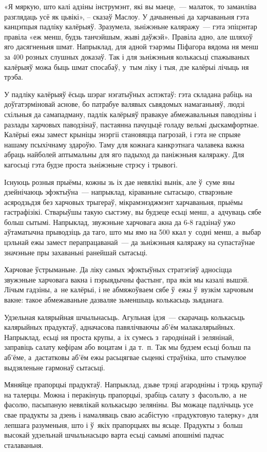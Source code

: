 «Я мяркую, што калі адзіны інструмэнт, які вы маеце,~--- малаток, то заманліва разглядаць усё як цьвікі», -- сказаў Маслоу. У дачыненьні да харчаваньня гэта канцэпцыя падліку калёрыяў. Зразумела, зьніжэньне каляражу~--- гэта эпіцэнтар правіла «еж менш, будзь танчэйшым, жыві даўжэй». Правіла адно, але шляхоў яго дасягненьня шмат. Напрыклад, для адной тэарэмы Піфагора вядома ня менш за 400 розных слушных доказаў. Так і для зьніжэньня колькасьці спажываных калёрыяў можа быць шмат спосабаў, у~тым ліку і тыя, дзе калёрыі лічыць ня трэба.

У падліку калёрыяў ёсьць шэраг нэгатыўных аспэктаў: гэта складана рабіць на доўгатэрміновай аснове, бо патрабуе валявых сьвядомых намаганьняў, людзі схільныя да самападману, падлік калёрыяў правакуе абмежавальныя паводзіны і разлады харчовых паводзінаў, пастаянна пачуцьцё голаду вельмі дыскамфортнае. Калёрыі ежы замест крыніцы энэргіі становяцца пагрозай, і гэта не спрыяе нашаму псыхічнаму здароўю. Таму для кожнага канкрэтнага чалавека важна абраць найболей аптымальны для яго падыход да паніжэньня каляражу. Для кагосьці гэта будзе проста зьніжэньне стрэсу і трывогі.

Існуюць розныя прыёмы, кожны зь іх дае невялікі вынік, але ў~суме яны дзейнічаюць эфэктыўна~--- напрыклад, кіраваньне сытасьцю, стварэньне асяродзьдзя без харчовых трыгераў, мікрамэнэджмэнт харчаваньня, прыёмы гастрафізікі. Стварыўшы такую сыстэму, вы будзеце есьці менш, а~адчуваць сябе больш сытымі. Напрыклад, звужэньне харчовага акна да 6-8 гадзінаў ужо аўтаматычна прыводзіць да таго, што мы ямо на 500 ккал у~содні менш, а~выбар цэльнай ежы замест перапрацаванай~--- да зьніжэньня каляражу на супастаўнае значэньне пры захаваньні ранейшай сытасьці.

Харчовае ўстрыманьне. Да ліку самых эфэктыўных стратэгіяў адносіцца звужэньне харчовага вакна і пэрыядычны фастынг, пра якія мы казалі вышэй. Лічым гадзіны, а~не калёрыі, і не абмяжоўваем сябе ў~ежы ў~вузкім харчовым вакне: такое абмежаваньне дазваляе зьменшыць колькасьць зьяданага.

Удзельная калярыйная шчыльнасьць. Агульная ідэя~--- скарачаць колькасьць калярыйных прадуктаў, адначасова павялічваючы аб'ём малакалярыйных. Напрыклад, есьці ня проста крупы, а~іх сумесь з~гароднінай і зелянінай, заправіць салату кефірам або воцатам і да т.~п. Так мы будзем есьці больш па аб'ёме, а~дастатковы аб'ём ежы расьцягвае сьценкі страўніка, што стымулюе выдзяленьне гармонаў сытасьці.

Мяняйце прапорцыі прадуктаў. Напрыклад, дзьве трэці агародніны і трэць крупаў на талерцы. Можна і перакінуць прапорцыі, зрабіць салату з~фасольлю, а~не фасолю, пасыпаную невялікай колькасьцю зеляніны. Вы можаце падлічыць усе свае прадукты за дзень і намаляваць сваю асабістую «прадуктовую талерку» для лепшага разуменьня, што і ў~якіх прапорцыях вы ясьце. Прадукты з~больш высокай удзельнай шчыльнасьцю варта есьці самымі апошнімі падчас сталаваньня.

